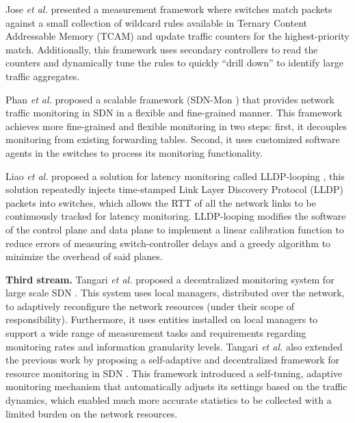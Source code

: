 Jose \textit{et al.} \cite{jose_2011:online_measurement} presented a measurement framework where switches match packets against a small collection of wildcard rules available in Ternary Content Addressable Memory (TCAM) and update traffic counters for the highest-priority match. Additionally, this framework uses secondary controllers to read the counters and dynamically tune the rules to quickly “drill down” to identify large traffic aggregates. 

Phan \textit{et al.} proposed a scalable framework (SDN-Mon \cite{phan2017:sdn_mon}) that provides network traffic monitoring in SDN in a flexible and fine-grained manner. This framework achieves more fine-grained and flexible monitoring in two steps: first, it decouples monitoring from existing forwarding tables. Second, it uses customized software agents in the switches to process its monitoring functionality. %

Liao \textit{et al.} proposed a solution for latency monitoring called LLDP-looping \cite{liao_2018:LLDP-looping}, this solution repeatedly injects time-stamped Link Layer Discovery Protocol (LLDP) packets into switches, which allows the RTT of all the network links to be continuously tracked for latency monitoring. LLDP-looping modifies the software of the control plane and data plane to implement a linear calibration function to reduce errors of measuring switch-controller delays and a greedy algorithm to minimize the overhead of said planes.

\textbf{Third stream.}
Tangari \textit{et al.} proposed a decentralized monitoring system for large scale SDN \cite{tangari_2017:decentralized_monitoring}. This system uses local managers, distributed over the network, to adaptively reconfigure the network resources (under their scope of responsibility). Furthermore, it uses entities installed on local managers to support a wide range of measurement tasks and requirements regarding monitoring rates and information granularity levels. Tangari \textit{et al.} also extended the previous work by proposing a self-adaptive and decentralized framework for resource monitoring in SDN \cite{Tangari_2018:adaptive_decentralized_monitoring}. This framework introduced a self-tuning, adaptive monitoring mechanism that automatically adjusts its settings based on the traffic dynamics, which enabled much more accurate statistics to be collected with a limited burden on the network resources.

